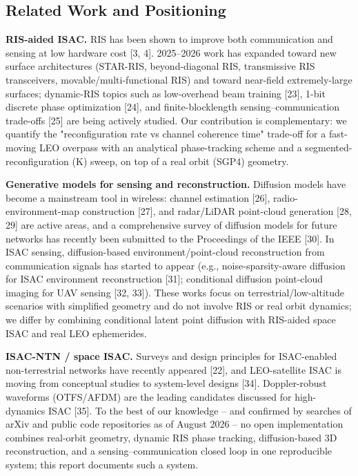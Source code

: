 \documentclass[11pt]{article}
\begin{document}
\subsection{Related Work and Positioning}

\textbf{RIS-aided ISAC.} RIS has been shown to improve both communication and sensing at low hardware cost [3, 4]. 2025--2026 work has expanded toward new surface architectures (STAR-RIS, beyond-diagonal RIS, transmissive RIS transceivers, movable/multi-functional RIS) and toward near-field extremely-large surfaces; dynamic-RIS topics such as low-overhead beam training [23], 1-bit discrete phase optimization [24], and finite-blocklength sensing--communication trade-offs [25] are being actively studied. Our contribution is complementary: we quantify the "reconfiguration rate vs channel coherence time" trade-off for a fast-moving LEO overpass with an analytical phase-tracking scheme and a segmented-reconfiguration (K) sweep, on top of a real orbit (SGP4) geometry.

\textbf{Generative models for sensing and reconstruction.} Diffusion models have become a mainstream tool in wireless: channel estimation [26], radio-environment-map construction [27], and radar/LiDAR point-cloud generation [28, 29] are active areas, and a comprehensive survey of diffusion models for future networks has recently been submitted to the Proceedings of the IEEE [30]. In ISAC sensing, diffusion-based environment/point-cloud reconstruction from communication signals has started to appear (e.g., noise-sparsity-aware diffusion for ISAC environment reconstruction [31]; conditional diffusion point-cloud imaging for UAV sensing [32, 33]). These works focus on terrestrial/low-altitude scenarios with simplified geometry and do not involve RIS or real orbit dynamics; we differ by combining conditional latent point diffusion with RIS-aided space ISAC and real LEO ephemerides.

\textbf{ISAC-NTN / space ISAC.} Surveys and design principles for ISAC-enabled non-terrestrial networks have recently appeared [22], and LEO-satellite ISAC is moving from conceptual studies to system-level designs [34]. Doppler-robust waveforms (OTFS/AFDM) are the leading candidates discussed for high-dynamics ISAC [35]. To the best of our knowledge -- and confirmed by searches of arXiv and public code repositories as of August 2026 -- no open implementation combines real-orbit geometry, dynamic RIS phase tracking, diffusion-based 3D reconstruction, and a sensing--communication closed loop in one reproducible system; this report documents such a system.
\end{document}
